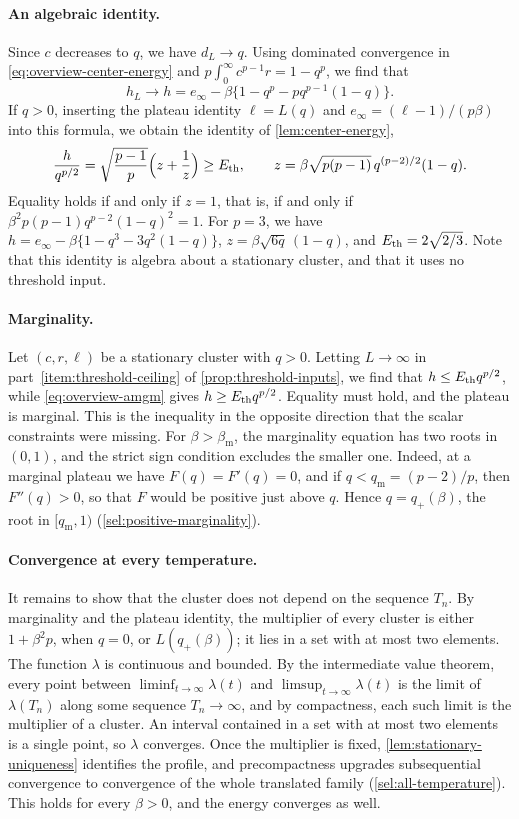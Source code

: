 \paragraph{An algebraic identity.}
Since $c$ decreases to $q$, we have $d_L\to q$. Using dominated convergence in \eqref{eq:overview-center-energy} and $p\int_0^\infty c^{p-1}r=1-q^p$, we find that
\[
 h_L\longrightarrow h=e_\infty-\beta\bigl\{1-q^p-pq^{p-1}(1-q)\bigr\}.
\]
If $q>0$, inserting the plateau identity $\ell=L(q)$ and $e_\infty=(\ell-1)/(p\beta)$ into this formula, we obtain the identity of \cref{lem:center-energy},
\begin{equation}\label{eq:overview-amgm}
 \frac h{q^{p/2}}=\sqrt{\frac{p-1}p}\Bigl(z+\frac1z\Bigr)\ge E_{\mathrm{th}},\qquad
 z=\beta\sqrt{p(p-1)}\,q^{(p-2)/2}(1-q).
\end{equation}
Equality holds if and only if $z=1$, that is, if and only if $\beta^2p(p-1)q^{p-2}(1-q)^2=1$. For $p=3$, we have $h=e_\infty-\beta\{1-q^3-3q^2(1-q)\}$, $z=\beta\sqrt{6q}\,(1-q)$, and $E_{\mathrm{th}}=2\sqrt{2/3}$. Note that this identity is algebra about a stationary cluster, and that it uses no threshold input.

\paragraph{Marginality.}
Let $(c,r,\ell)$ be a stationary cluster with $q>0$. Letting $L\to\infty$ in part~\ref{item:threshold-ceiling} of \cref{prop:threshold-inputs}, we find that $h\le E_{\mathrm{th}} q^{p/2}$, while \eqref{eq:overview-amgm} gives $h\ge E_{\mathrm{th}} q^{p/2}$. Equality must hold, and the plateau is marginal. This is the inequality in the opposite direction that the scalar constraints were missing. For $\beta>\beta_{\mathrm m}$, the marginality equation has two roots in $(0,1)$, and the strict sign condition excludes the smaller one. Indeed, at a marginal plateau we have $F(q)=F'(q)=0$, and if $q<q_{\mathrm m}=(p-2)/p$, then $F''(q)>0$, so that $F$ would be positive just above $q$. Hence $q=q_+(\beta)$, the root in $[q_{\mathrm m},1)$ (\cref{sel:positive-marginality}).

\paragraph{Convergence at every temperature.}
It remains to show that the cluster does not depend on the sequence $T_n$. By marginality and the plateau identity, the multiplier of every cluster is either $1+\beta^2p$, when $q=0$, or $L(q_+(\beta))$; it lies in a set with at most two elements. The function $\lambda$ is continuous and bounded. By the intermediate value theorem, every point between $\liminf_{t\to\infty}\lambda(t)$ and $\limsup_{t\to\infty}\lambda(t)$ is the limit of $\lambda(T_n)$ along some sequence $T_n\to\infty$, and by compactness, each such limit is the multiplier of a cluster. An interval contained in a set with at most two elements is a single point, so $\lambda$ converges. Once the multiplier is fixed, \cref{lem:stationary-uniqueness} identifies the profile, and precompactness upgrades subsequential convergence to convergence of the whole translated family (\cref{sel:all-temperature}). This holds for every $\beta>0$, and the energy converges as well.

